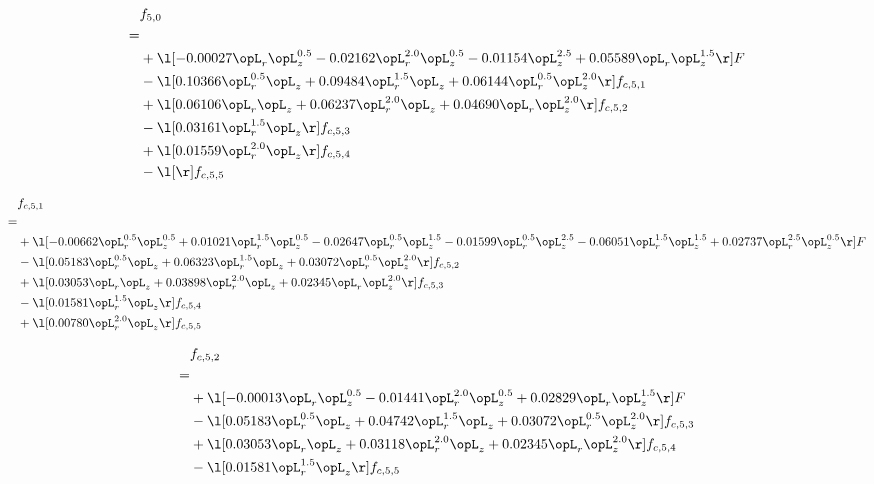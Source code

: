 \begin{alignat}{2} 
\label{eq:f_50_2} 
& f_{5,0} \nonumber \\ 
 = \\ 
& + \l[  -0.00027 \opL_r \opL_z^{0.5}   -0.02162 \opL_r^{2.0} \opL_z^{0.5}   -0.01154 \opL_z^{2.5} +  0.05589 \opL_r \opL_z^{1.5}  \r] F \nonumber \\ 
& - \l[  0.10366 \opL_r^{0.5} \opL_z +  0.09484 \opL_r^{1.5} \opL_z +  0.06144 \opL_r^{0.5} \opL_z^{2.0}  \r] f_{c,5,1} \nonumber \\ 
& + \l[  0.06106 \opL_r \opL_z +  0.06237 \opL_r^{2.0} \opL_z +  0.04690 \opL_r \opL_z^{2.0}  \r] f_{c,5,2} \nonumber \\ 
& - \l[  0.03161 \opL_r^{1.5} \opL_z  \r] f_{c,5,3} \nonumber \\ 
& + \l[  0.01559 \opL_r^{2.0} \opL_z  \r] f_{c,5,4} \nonumber \\ 
& - \l[  \r] f_{c,5,5} \nonumber \\ 
\end{alignat} 


\begin{alignat}{2} 
\label{eq:f_51_2} 
& f_{c,5,1} \nonumber \\ 
 = \\ 
& + \l[  -0.00662 \opL_r^{0.5} \opL_z^{0.5} +  0.01021 \opL_r^{1.5} \opL_z^{0.5}   -0.02647 \opL_r^{0.5} \opL_z^{1.5}   -0.01599 \opL_r^{0.5} \opL_z^{2.5}   -0.06051 \opL_r^{1.5} \opL_z^{1.5} +  0.02737 \opL_r^{2.5} \opL_z^{0.5}  \r] F \nonumber \\ 
& - \l[  0.05183 \opL_r^{0.5} \opL_z +  0.06323 \opL_r^{1.5} \opL_z +  0.03072 \opL_r^{0.5} \opL_z^{2.0}  \r] f_{c,5,2} \nonumber \\ 
& + \l[  0.03053 \opL_r \opL_z +  0.03898 \opL_r^{2.0} \opL_z +  0.02345 \opL_r \opL_z^{2.0}  \r] f_{c,5,3} \nonumber \\ 
& - \l[  0.01581 \opL_r^{1.5} \opL_z  \r] f_{c,5,4} \nonumber \\ 
& + \l[  0.00780 \opL_r^{2.0} \opL_z  \r] f_{c,5,5} \nonumber \\ 
\end{alignat} 


\begin{alignat}{2} 
\label{eq:f_52_2} 
& f_{c,5,2} \nonumber \\ 
 = \\ 
& + \l[  -0.00013 \opL_r \opL_z^{0.5}   -0.01441 \opL_r^{2.0} \opL_z^{0.5} +  0.02829 \opL_r \opL_z^{1.5}  \r] F \nonumber \\ 
& - \l[  0.05183 \opL_r^{0.5} \opL_z +  0.04742 \opL_r^{1.5} \opL_z +  0.03072 \opL_r^{0.5} \opL_z^{2.0}  \r] f_{c,5,3} \nonumber \\ 
& + \l[  0.03053 \opL_r \opL_z +  0.03118 \opL_r^{2.0} \opL_z +  0.02345 \opL_r \opL_z^{2.0}  \r] f_{c,5,4} \nonumber \\ 
& - \l[  0.01581 \opL_r^{1.5} \opL_z  \r] f_{c,5,5} \nonumber \\ 
\end{alignat} 


